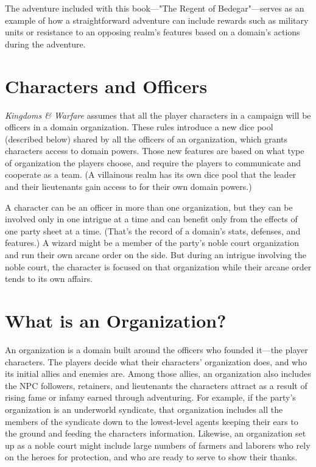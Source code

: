\documentclass[10pt,a4paper,twoside,bg=print,twocolumn,openany,nodeprecatedcode]{dndbook}
\begin{document}
The adventure included with this book—"The Regent of Bedegar"—serves as an example of how a straightforward adventure can include rewards such as military units or resistance to an opposing realm's features based on a domain's actions during the adventure.

\section{Characters and Officers}
\textit{Kingdoms \& Warfare} assumes that all the player characters in a campaign will be officers in a domain organization. These rules introduce a new dice pool (described below) shared by all the officers of an organization, which grants characters access to domain powers. Those new features are based on what type of organization the players choose, and require the players to communicate and cooperate as a team. (A villainous realm has its own dice pool that the leader and their lieutenants gain access to for their own domain powers.)

A character can be an officer in more than one organization, but they can be involved only in one intrigue at a time and can benefit only from the effects of one party sheet at a time. (That's the record of a domain's stats, defenses, and features.) A wizard might be a member of the party's noble court organization and run their own arcane order on the side. But during an intrigue involving the noble court, the character is focused on that organization while their arcane order tends to its own affairs.

\section{What is an Organization?}
An organization is a domain built around the officers who founded it—the player characters. The players decide what their characters' organization does, and who its initial allies and enemies are. Among those allies, an organization also includes the NPC followers, retainers, and lieutenants the characters attract as a result of rising fame or infamy earned through adventuring. For example, if the party's organization is an underworld syndicate, that organization includes all the members of the syndicate down to the lowest-level agents keeping their ears to the ground and feeding the characters information. Likewise, an organization set up as a noble court might include large numbers of farmers and laborers who rely on the heroes for protection, and who are ready to serve to show their thanks.
\end{document}

